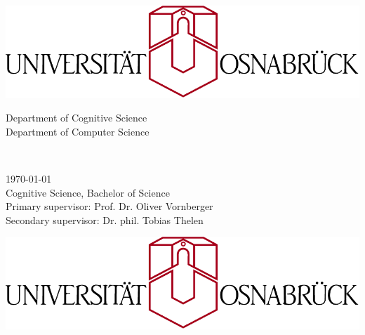 \begin{titlepage}
  \begin{addmargin}[-1cm]{-3cm}
    \begin{center}
      \large
      \hfill

      \includegraphics[width=\textwidth]{img/uos2} \\
      \bigskip

      Department of Cognitive Science\\ \medskip
      Department of Computer Science

      \vfill

      \Large
       \\
      \bigskip

      \begingroup
        \LARGE
        \color{uos_red}
      \endgroup
      \bigskip

      \Large

      \vfill
      \vfill
    \end{center}

    \today \\
    Cognitive Science, Bachelor of Science \\
    Primary supervisor: Prof. Dr. Oliver Vornberger \\
    Secondary supervisor: Dr. phil. Tobias Thelen \\
  \end{addmargin}
  \cleardoublepage
  \begin{addmargin}[-1cm]{-3cm}
    \begin{center}
      \large
      \hfill

      \includegraphics[width=\textwidth]{img/uos2} \\
      \bigskip


\end{center}
\end{addmargin}
\end{titlepage}
